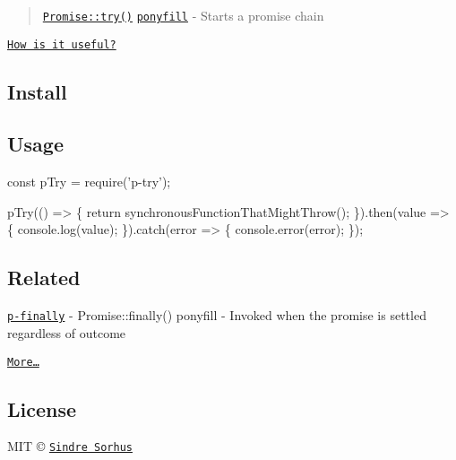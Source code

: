 \begin{quote}
\href{https://github.com/ljharb/proposal-promise-try}{\tt {\ttfamily Promise\+::try()}} \href{https://ponyfill.com}{\tt ponyfill} -\/ Starts a promise chain \end{quote}


\href{http://cryto.net/~joepie91/blog/2016/05/11/what-is-promise-try-and-why-does-it-matter/}{\tt How is it useful?}

\subsection*{Install}




\subsection*{Usage}


\begin{DoxyCode}
const pTry = require('p-try');

pTry(() => \{
    return synchronousFunctionThatMightThrow();
\}).then(value => \{
    console.log(value);
\}).catch(error => \{
    console.error(error);
\});
\end{DoxyCode}


\subsection*{Related}


\begin{DoxyItemize}
\item \href{https://github.com/sindresorhus/p-finally}{\tt p-\/finally} -\/ {\ttfamily Promise\+::finally()} ponyfill -\/ Invoked when the promise is settled regardless of outcome
\item \href{https://github.com/sindresorhus/promise-fun}{\tt More…}
\end{DoxyItemize}

\subsection*{License}

M\+IT © \href{https://sindresorhus.com}{\tt Sindre Sorhus} 
